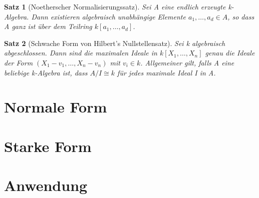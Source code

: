 \documentclass{article}
\newtheorem{satz}{Satz}
\begin{document}
	\begin{satz}[Noetherscher Normalisierungssatz]
	Sei A eine endlich erzeugte k-Algebra. Dann existieren algebraisch
	unabhängige Elemente \(a_1, \ldots, a_d \in A\), so dass A ganz ist über
	dem Teilring \(k[a_1, \ldots, a_d]\).
	\end{satz}

	\begin{satz}[Schwache Form von Hilbert's Nullstellensatz]
	Sei k algebraisch abgeschlossen. Dann sind die maximalen Ideale in
	\(k[X_1, \ldots, X_n]\) genau die Ideale der Form \((X_1-v_1,\ldots,
	X_n-v_n)\) mit \(v_i \in k\). Allgemeiner gilt, falls A eine beliebige
	k-Algebra ist, dass \(A/I \cong k\) für jedes maximale Ideal I in A.
	\end{satz}


\section{Normale Form}
\section{Starke Form}
\section{Anwendung}
\end{document}
